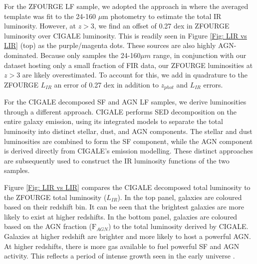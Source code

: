 For the ZFOURGE LF sample, we adopted the approach in \cite{straatman_fourstar_2016} where the averaged \cite{wuyts_fireworks_2008} template was fit to the 24-160 $\mu$m photometry to estimate the total IR luminosity. However, at $z>3$, we find an offset of 0.27 dex in ZFOURGE luminosity over CIGALE luminosity. This is readily seen in Figure \ref{Fig: LIR vs LIR} (top) as the purple/magenta dots. These sources are also highly AGN-dominated. Because \cite{wuyts_fireworks_2008} only samples the 24-160$\mu m$ range, in conjunction with our dataset hosting only a small fraction of FIR data, our ZFOURGE luminosities at $z>3$ are likely overestimated. To account for this, we add in quadrature to the ZFOURGE $L_{IR}$ an error of 0.27 dex in addition to $z_{phot}$ and $L_{IR}$ errors.

For the CIGALE decomposed SF and AGN LF samples, we derive luminosities through a different approach. CIGALE performs SED decomposition on the entire galaxy emission, using its integrated models to separate the total luminosity into distinct stellar, dust, and AGN components. The stellar and dust luminosities are combined to form the SF component, while the AGN component is derived directly from CIGALE's emission modelling. These distinct approaches are subsequently used to construct the IR luminosity functions of the two samples. 

Figure \ref{Fig: LIR vs LIR} compares the CIGALE decomposed total luminosity to the ZFOURGE total luminosity ($L_{IR}$). In the top panel, galaxies are coloured based on their redshift bin. It can be seen that the brightest galaxies are more likely to exist at higher redshifts. In the bottom panel, galaxies are coloured based on the AGN fraction ($\mathrm{F}_{AGN}$) to the total luminosity derived by CIGALE. Galaxies at higher redshift are brighter and more likely to host a powerful AGN. At higher redshifts, there is more gas available to fuel powerful SF and AGN activity. This reflects a period of intense growth seen in the early universe \citep{madau_cosmic_2014}.

